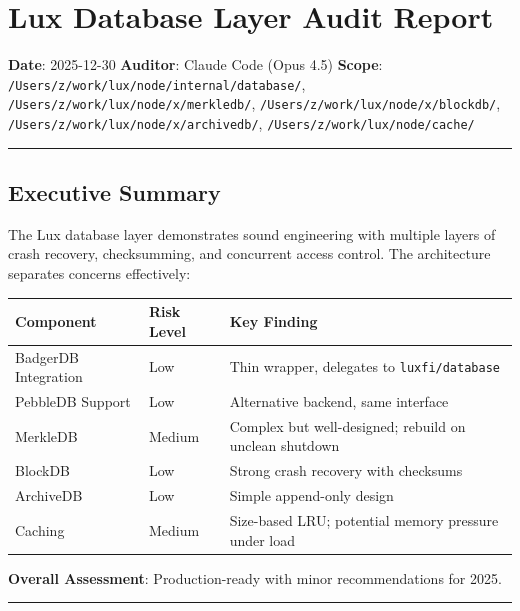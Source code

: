 \documentclass[
]{article}
\author{}
\date{}
\newcounter{none} %
\begin{document}
\section{Lux Database Layer Audit
Report}\label{lux-database-layer-audit-report}

\textbf{Date}: 2025-12-30 \textbf{Auditor}: Claude Code (Opus 4.5)
\textbf{Scope}: \texttt{/Users/z/work/lux/node/internal/database/},
\texttt{/Users/z/work/lux/node/x/merkledb/},
\texttt{/Users/z/work/lux/node/x/blockdb/},
\texttt{/Users/z/work/lux/node/x/archivedb/},
\texttt{/Users/z/work/lux/node/cache/}

\begin{center}\rule{0.5\linewidth}{0.5pt}\end{center}

\subsection{Executive Summary}\label{executive-summary}

The Lux database layer demonstrates sound engineering with multiple
layers of crash recovery, checksumming, and concurrent access control.
The architecture separates concerns effectively:

{\def\LTcaptype{none} %
\begin{longtable}[]{@{}lll@{}}
\toprule\noalign{}
Component & Risk Level & Key Finding \\
\midrule\noalign{}
\endhead
\bottomrule\noalign{}
\endlastfoot
BadgerDB Integration & Low & Thin wrapper, delegates to
\texttt{luxfi/database} \\
PebbleDB Support & Low & Alternative backend, same interface \\
MerkleDB & Medium & Complex but well-designed; rebuild on unclean
shutdown \\
BlockDB & Low & Strong crash recovery with checksums \\
ArchiveDB & Low & Simple append-only design \\
Caching & Medium & Size-based LRU; potential memory pressure under
load \\
\end{longtable}
}

\textbf{Overall Assessment}: Production-ready with minor recommendations
for 2025.

\begin{center}\rule{0.5\linewidth}{0.5pt}\end{center}
\end{document}
